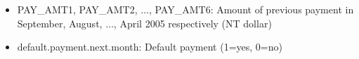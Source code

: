 \documentclass[11pt]{article}
\begin{document}
\begin{multicols}{2}
\begin{itemize}[noitemsep]
\item PAY\_AMT1, PAY\_AMT2, $\hdots$, PAY\_AMT6: Amount of previous payment in September, August, $\hdots$, April 2005 respectively (NT dollar)
\item default.payment.next.month: Default payment (1=yes, 0=no)
\end{itemize}


\end{multicols}
\end{document}
